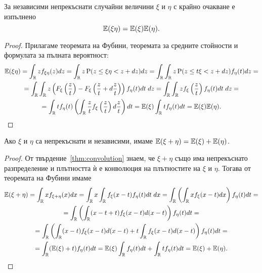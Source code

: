 \documentclass[numbers=endperiod, DIV=15, bibliography=totocnumbered]{scrartcl}
\begin{document}
\begin{proposition}\label{thm:expect-product}
  За независими непрекъснати случайни величини $\xi$ и $\eta$ с крайно очакване е изпълнено
  \begin{displaymath}
    \mathbb{E}(\xi \eta) = \mathbb{E}(\xi) \mathbb{E}(\eta).
  \end{displaymath}
\end{proposition}
\begin{proof}
  Прилагаме теоремата на Фубини, теоремата за средните стойности и формулата за пълната вероятност:
  \begin{multline*}
    \mathbb{E}(\xi \eta)
    =
    \int_{\mathbb{R}} z f_{\xi \eta}(z) dz
    =
    \int_{\mathbb{R}} z \operatorname{P}(z \leq \xi \eta < z + dz) dz
    =
    \int_{\mathbb{R}} \int_{\mathbb{R}} z \operatorname{P}(z \leq t \xi < z + dz) f_\eta(t) dz
    = \\ =
    \int_{\mathbb{R}} \int_{\mathbb{R}} z \left( F_\xi\left(\frac z t \right) - F_\xi\left(\frac z t + d\frac z t \right) \right) f_\eta(t) dt \; dz
    =
    \int_{\mathbb{R}} \int_{\mathbb{R}} z f_\xi \left(\frac z t \right) f_\eta(t) dt \; dz
    = \\ =
    \int_{\mathbb{R}} t f_\eta(t) \left(\int_{\mathbb{R}} \frac z t f_\xi \left(\frac z t \right) d\frac z t \right) dt
    =
    \mathbb{E}(\xi) \int_{\mathbb{R}} t f_\eta(t) dt
    =
    \mathbb{E}(\xi) \mathbb{E}(\eta).
  \end{multline*}
\end{proof}

\begin{proposition}\label{thm:expect-additive}
  Ако $\xi$ и $\eta$ са непрекъснати и независими, имаме $\mathbb{E}(\xi + \eta) = \mathbb{E}(\xi) + \mathbb{E}(\eta)$.
\end{proposition}
\begin{proof}
  От твърдение~\ref{thm:convolution} знаем, че $\xi + \eta$ също има непрекъснато разпределение и плътността ѝ е конволюция на плътностите на $\xi$ и $\eta$. Тогава от теоремата на Фубини имаме
  \begin{multline*}
    \mathbb{E}(\xi + \eta)
    =
    \int_{\mathbb{R}} x f_{\xi + \eta} (x) dx
    =
    \int_{\mathbb{R}} x \int_{\mathbb{R}} f_\xi(x - t) f_\eta(t) dt \; dx
    =
    \int_{\mathbb{R}} \left( \int_{\mathbb{R}} x f_\xi(x - t) dx \right) f_\eta(t) dt
    = \\ =
    \int_{\mathbb{R}} \left( \int_{\mathbb{R}} (x - t + t) f_\xi(x - t) d(x - t) \right) f_\eta(t) dt
    = \\ =
    \int_{\mathbb{R}} \left( \int_{\mathbb{R}} (x - t) f_\xi(x - t) d(x - t) + t \int_{\mathbb{R}} f_\xi(x - t) d(x - t) \right) f_\eta(t) dt
    = \\ =
    \int_{\mathbb{R}} (\mathbb{E}(\xi) + t) f_\eta(t) dt
    =
    \mathbb{E}(\xi) \int_{\mathbb{R}} f_\eta(t) dt + \int_{\mathbb{R}} t f_\eta(t) dt
    =
    \mathbb{E}(\xi) + \mathbb{E}(\eta).
  \end{multline*}
\end{proof}
\end{document}
